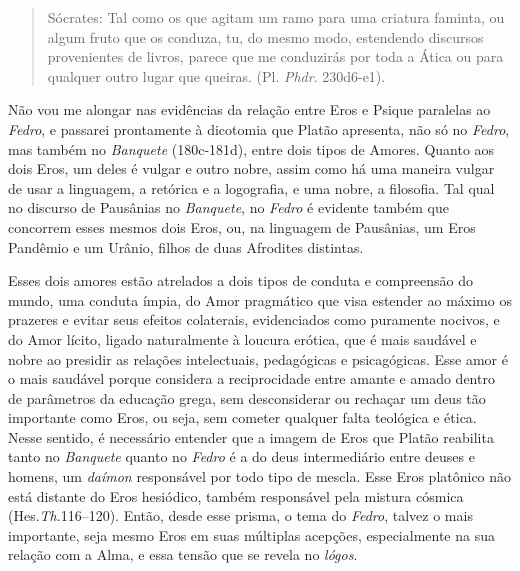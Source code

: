  

\begin{quote}
Sócrates: \redondo{[…]} Tal como os que agitam um ramo para uma
criatura faminta, ou algum fruto que os conduza, tu, do mesmo modo,
estendendo discursos provenientes de livros, parece que me conduzirás
por toda a Ática ou para qualquer outro lugar que queiras.
(Pl. \emph{Phdr}. 230d6-e1).
\end{quote}

 

Não vou me alongar nas evidências da relação entre Eros e Psique
paralelas ao \emph{Fedro}, e passarei prontamente à dicotomia que Platão
apresenta, não só no \emph{Fedro}, mas também
no \emph{Banquete }(180c-181d), entre dois tipos de Amores. Quanto aos
dois Eros, um deles é vulgar e outro nobre, assim como há uma maneira
vulgar de usar a linguagem, a retórica e a logografia, e uma nobre, a
filosofia. Tal qual no discurso de Pausânias no \emph{Banquete},
no \emph{Fedro} é evidente também que concorrem esses mesmos dois Eros,
ou, na linguagem de Pausânias, um Eros Pandêmio e um Urânio, filhos de
duas Afrodites distintas.

Esses dois amores estão atrelados a dois tipos de conduta e compreensão
do mundo, uma conduta ímpia, do Amor pragmático que visa estender ao
máximo os prazeres e evitar seus efeitos colaterais, evidenciados como
puramente nocivos, e do Amor lícito, ligado naturalmente à loucura
erótica, que é mais saudável e nobre ao presidir as relações
intelectuais, pedagógicas e psicagógicas. Esse amor é o mais saudável
porque considera a reciprocidade entre amante e amado dentro de
parâmetros da educação grega, sem desconsiderar ou rechaçar um deus tão
importante como Eros, ou seja, sem cometer qualquer falta teológica e
ética. Nesse sentido, é necessário entender que a imagem de Eros que
Platão reabilita tanto no \emph{Banquete} quanto no \emph{Fedro} é a do
deus intermediário entre deuses e homens, um \emph{daímon} responsável
por todo tipo de mescla. Esse Eros platônico não está distante do Eros
hesiódico, também responsável pela mistura cósmica
(Hes.\emph{Th}.116--120). Então, desde esse prisma, o tema
do \emph{Fedro}, talvez o mais importante, seja mesmo Eros em suas
múltiplas acepções, especialmente na sua relação com a Alma, e essa
tensão que se revela no \emph{lógos}.

